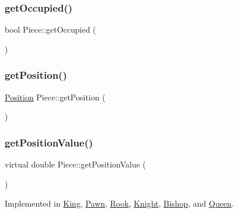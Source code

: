 \mbox{\label{class_piece_abde93826a7b04b9e0f9739b11df0629e}} 
\subsubsection{\texorpdfstring{get\+Occupied()}{getOccupied()}}
{\footnotesize\ttfamily bool Piece\+::get\+Occupied (\begin{DoxyParamCaption}{ }\end{DoxyParamCaption})}

\mbox{\label{class_piece_a2dee0ebeffdb733e17574471c441e06d}} 
\subsubsection{\texorpdfstring{get\+Position()}{getPosition()}}
{\footnotesize\ttfamily \hyperlink{struct_position}{Position} Piece\+::get\+Position (\begin{DoxyParamCaption}{ }\end{DoxyParamCaption})}

\mbox{\label{class_piece_a4adfa58b4f0368c9a5859afcf294e0a4}} 
\subsubsection{\texorpdfstring{get\+Position\+Value()}{getPositionValue()}}
{\footnotesize\ttfamily virtual double Piece\+::get\+Position\+Value (\begin{DoxyParamCaption}{ }\end{DoxyParamCaption})\hspace{0.3cm}{\ttfamily [pure virtual]}}



Implemented in \hyperlink{class_king_a047413f5f6df784b2fd308f20e356ea4}{King}, \hyperlink{class_pawn_a332e70ab65f480521428aa87c7cd2ef9}{Pawn}, \hyperlink{class_rook_ab1d83e6acb838249647f1f5fa7d17f41}{Rook}, \hyperlink{class_knight_aa5116e2b3cbbb576283015565b6261a1}{Knight}, \hyperlink{class_bishop_a03f53aab9a31cf09c3d252053231eedc}{Bishop}, and \hyperlink{class_queen_aa2ca0d72a74a245470f502a82eaf1052}{Queen}.

